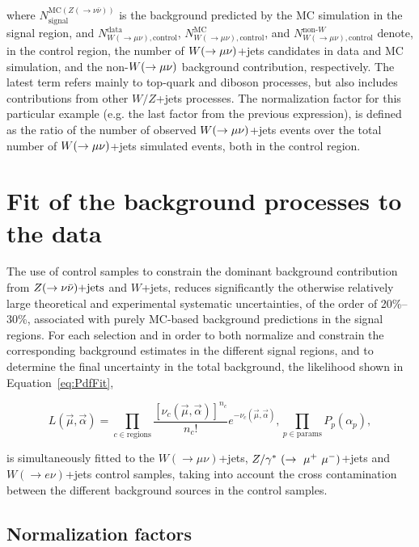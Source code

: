 \noindent where $N^{\text{MC}(Z(\rightarrow\nu\bar{\nu}))}_{\text{signal}}$ is the background predicted by the MC simulation in the signal region, and $N^{\text{data}}_{W(\rightarrow\mu\nu),\text{control}}$, $N^{\text{MC}}_{W(\rightarrow\mu\nu),\text{control}}$, and $N^{\text{non-}W}_{W(\rightarrow\mu\nu),\text{control}}$ denote, in the control region, the number of $W(\rightarrow \mu \nu)$+jets candidates in data and MC simulation, and the non-$W(\rightarrow \mu \nu)$ background contribution, respectively.
The latest term refers mainly to top-quark and diboson processes, but also includes contributions from other $W/Z$+jets processes.
The normalization factor for this particular example (e.g. the last factor from the previous expression), is defined as the ratio of the number of observed $W(\rightarrow \mu \nu)$+jets events over the total number of $W(\rightarrow \mu \nu)$+jets simulated events, both in the control region.


\section{Fit of the background processes to the data}
    \label{sec:Fit}

The use of control samples to constrain the dominant background contribution from $Z(\rightarrow \nu \bar{\nu})\text{+jets}$ and $W$+jets, reduces significantly the otherwise relatively large theoretical and experimental systematic uncertainties, of the order of 20\%--30\%, associated with purely MC-based background predictions in the signal regions.
For each selection and in order to both normalize and constrain the corresponding background estimates in the different signal regions, and to determine the final uncertainty in the total background, the likelihood shown in Equation~\ref{eq:PdfFit},

\begin{equation}
L(\vec{\mu}, \vec{\alpha}) = 
 \prod_{c \in \text{regions}}{\frac{[\nu_c(\vec{\mu}, \vec{\alpha})]^{n_c}}{n_c!}e^{-\nu_c(\vec{\mu}, \vec{\alpha})}},
 \prod_{p\in\text{params}}{P_p(\alpha_p)},
\label{eq:PdfFit_copy}
\end{equation}

\noindent is simultaneously fitted to the $W(\rightarrow \mu\nu)$+jets, $Z/\gamma^*~(\rightarrow~\mu^+~\mu^-)$+jets and $W(\rightarrow e\nu)$+jets control samples, taking into account the cross contamination between the different background sources in the control samples.


\subsection{Normalization factors}
    \label{subsec:FreeParameters}


